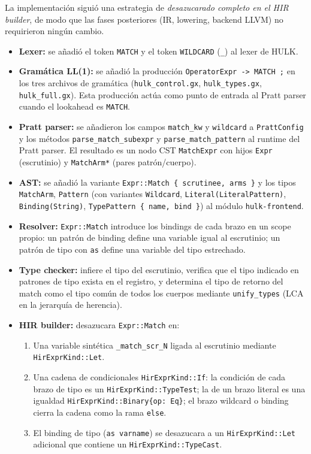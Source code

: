 \documentclass[12pt,letterpaper]{article}
\newcommand{\hulk}{\textsc{HULK}}
\newcommand{\src}[1]{\texttt{#1}}
\begin{document}
La implementación siguió una estrategia de \emph{desazucarado completo en el HIR builder}, de modo que las fases posteriores (IR, lowering, backend LLVM) no requirieron ningún cambio.

\begin{itemize}
    \item \textbf{Lexer:} se añadió el token \src{MATCH} y el token \src{WILDCARD} (\src{\_}) al lexer de \hulk{}.
    \item \textbf{Gramática LL(1):} se añadió la producción \src{OperatorExpr -> MATCH ;} en los tres archivos de gramática (\src{hulk\_control.gx}, \src{hulk\_types.gx}, \src{hulk\_full.gx}). Esta producción actúa como punto de entrada al Pratt parser cuando el lookahead es \src{MATCH}.
    \item \textbf{Pratt parser:} se añadieron los campos \src{match\_kw} y \src{wildcard} a \src{PrattConfig} y los métodos \src{parse\_match\_subexpr} y \src{parse\_match\_pattern} al runtime del Pratt parser. El resultado es un nodo CST \src{MatchExpr} con hijos \src{Expr} (escrutinio) y \src{MatchArm*} (pares patrón/cuerpo).
    \item \textbf{AST:} se añadió la variante \src{Expr::Match \{ scrutinee, arms \}} y los tipos \src{MatchArm}, \src{Pattern} (con variantes \src{Wildcard}, \src{Literal(LiteralPattern)}, \src{Binding(String)}, \src{TypePattern \{ name, bind \}}) al módulo \src{hulk-frontend}.
    \item \textbf{Resolver:} \src{Expr::Match} introduce los bindings de cada brazo en un scope propio: un patrón de binding define una variable igual al escrutinio; un patrón de tipo con \src{as} define una variable del tipo estrechado.
    \item \textbf{Type checker:} infiere el tipo del escrutinio, verifica que el tipo indicado en patrones de tipo exista en el registro, y determina el tipo de retorno del match como el tipo común de todos los cuerpos mediante \src{unify\_types} (LCA en la jerarquía de herencia).
    \item \textbf{HIR builder:} desazucara \src{Expr::Match} en:
    \begin{enumerate}
        \item Una variable sintética \src{\_match\_scr\_N} ligada al escrutinio mediante \src{HirExprKind::Let}.
        \item Una cadena de condicionales \src{HirExprKind::If}: la condición de cada brazo de tipo es un \src{HirExprKind::TypeTest}; la de un brazo literal es una igualdad \src{HirExprKind::Binary\{op: Eq\}}; el brazo wildcard o binding cierra la cadena como la rama \src{else}.
        \item El binding de tipo (\src{as varname}) se desazucara a un \src{HirExprKind::Let} adicional que contiene un \src{HirExprKind::TypeCast}.
    \end{enumerate}
\end{itemize}
\end{document}
